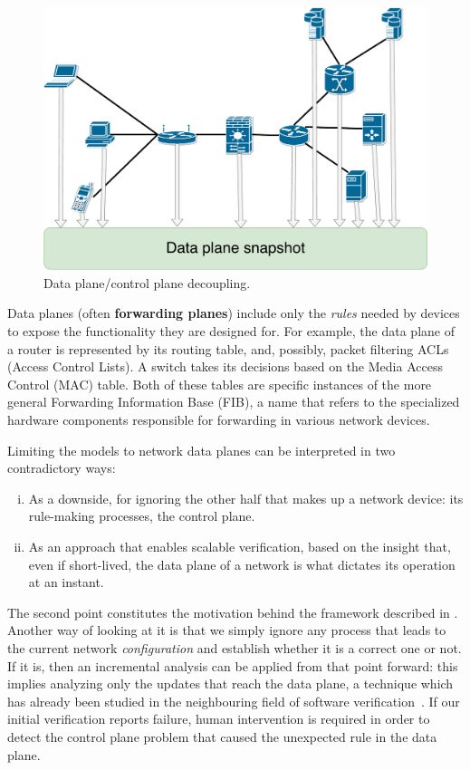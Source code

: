 \begin{figure}[h]
  \centering
  \captionsetup{justification=centering}
  \includegraphics[scale=0.3]{src/img/data-plane-snapshot}
  \caption{Data plane/control plane decoupling.}
  \label{fig:data-plane-snapshot}
\end{figure}

Data planes (often \textbf{forwarding planes}) include only the \emph{rules}
needed by devices to expose the functionality they are designed for.  For
example, the data plane of a router is represented by its routing table, and,
possibly, packet filtering ACLs (Access Control Lists).  A switch takes its decisions based on the Media Access Control
(MAC) table. Both of these tables are
specific instances of the more general Forwarding Information Base
(FIB), a name that refers to the
specialized hardware components responsible for forwarding in various network
devices.

Limiting the models to network data planes can be interpreted in two
contradictory ways:
\begin{enumerate}[(i)]
  \item As a downside, for ignoring the other half that makes up a network
    device: its rule-making processes, the control plane.
  \item As an approach that enables scalable verification, based on the insight
    that, even if short-lived, the data plane of a network is what dictates its
    operation at an instant.
\end{enumerate}

The second point constitutes the motivation behind the framework described in
.  Another way of looking at it is that
we simply ignore any process that leads to the current network
\emph{configuration} and establish whether it is a correct one or not.  If it
is, then an incremental analysis can be applied from that point forward: this
implies analyzing only the updates that reach the data plane, a technique which
has already been studied in the neighbouring field of software
verification~\cite{marinescu2013katch}.  If our initial verification reports
failure, human intervention is required in order to detect the control plane
problem that caused the unexpected rule in the data plane.


